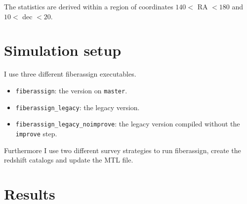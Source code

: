 \documentclass{article}
\begin{document}
The statistics are derived within a region of coordinates 
$140<$ RA $<180$ and
$10<$ dec $<20$. 

\section{Simulation setup}

I use three different fiberassign executables.
\begin{itemize}
\item \verb"fiberassign": the version on \verb'master'.
\item \verb"fiberassign_legacy": the legacy version.
\item \verb'fiberassign_legacy_noimprove': the legacy version compiled
without the \verb'improve' step.
\end{itemize}

Furthermore I use two different survey strategies to run fiberassign, 
create the redshift catalogs and update the MTL file.

\section{Results}
\end{document}
